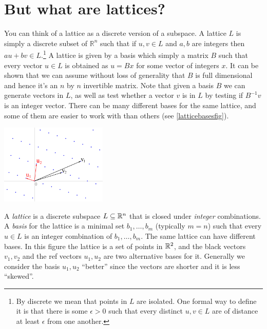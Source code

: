 \section{But what are lattices?}\label{12-But-what-are-lattices}

You can think of a lattice as a discrete version of a subspace. A
lattice \(L\) is simply a discrete subset of \(\mathbb{R}^n\) such that
if \(u,v\in L\) and \(a,b\) are integers then \(au+bv\in L\).\footnote{By
  discrete we mean that points in \(L\) are isolated. One formal way to
  define it is that there is some \(\epsilon>0\) such that every
  distinct \(u,v \in L\) are of distance at least \(\epsilon\) from one
  another.} A lattice is given by a basis which simply a matrix \(B\)
such that every vector \(u\in L\) is obtained as \(u=Bx\) for some
vector of integers \(x\). It can be shown that we can assume without
loss of generality that \(B\) is full dimensional and hence it's an
\(n\) by \(n\) invertible matrix. Note that given a basis \(B\) we can
generate vectors in \(L\), as well as test whether a vector \(v\) is in
\(L\) by testing if \(B^{-1}v\) is an integer vector. There can be many
different bases for the same lattice, and some of them are easier to
work with than others (see \cref{latticebasesfig}).

\begin{marginfigure}
\centering
\includegraphics[width=\linewidth, height=1.5in, keepaspectratio]{../figure/Lattice-reduction.png}
\caption{A \emph{lattice} is a discrete subspace \(L \subseteq {\mathbb{R}}^n\)
that is closed under \emph{integer} combinations. A \emph{basis} for the
lattice is a minimal set \(b_1,\ldots,b_m\) (typically \(m=n\)) such
that every \(u \in L\) is an integer combination of \(b_1,\ldots,b_m\).
The same lattice can have different bases. In this figure the lattice is
a set of points in \({\mathbb{R}}^2\), and the black vectors \(v_1,v_2\) and the
ref vectors \(u_1,u_2\) are two alternative bases for it. Generally we
consider the basis \(u_1,u_2\) ``better'' since the vectors are shorter
and it is less ``skewed''.}
\label{latticebasesfig}
\end{marginfigure}

